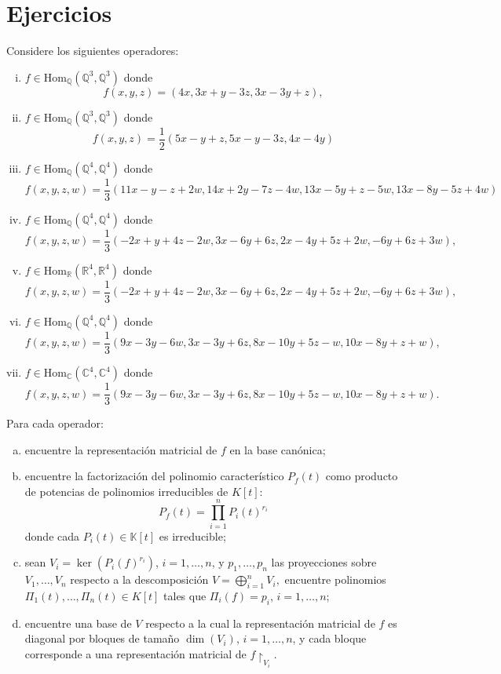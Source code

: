 \section*{Ejercicios}
Considere los siguientes operadores:
\begin{enumerate}[(i)]
\item $f\in\textrm{Hom}_{\mathbb{Q}}(\mathbb{Q}^3,\mathbb{Q}^3)$ donde
$$f(x,y,z)=(4x,3x+y-3z,3x-3y+z),$$
\item $f\in\textrm{Hom}_{\mathbb{Q}}(\mathbb{Q}^3,\mathbb{Q}^3)$ donde
$$f(x,y,z)=\frac{1}{2}(5x-y+z,5x-y-3z,4x-4y)$$
\item $f\in\textrm{Hom}_{\mathbb{Q}}(\mathbb{Q}^4,\mathbb{Q}^4)$ donde
$$f(x,y,z,w)=\frac{1}{3}(11x-y-z+2w,14x+2y-7z-4w,13x-5y+z-5w,13x-8y-5z+4w)$$
\item $f\in\textrm{Hom}_{\mathbb{Q}}(\mathbb{Q}^4,\mathbb{Q}^4)$ donde
$$f(x,y,z,w)=\dfrac{1}{3}(-2x+y+4z-2w,3x-6y+6z,2x-4y+5z+2w,-6y+6z+3w),$$
\item $f\in\textrm{Hom}_{\mathbb{R}}(\mathbb{R}^4,\mathbb{R}^4)$ donde
$$f(x,y,z,w)=\dfrac{1}{3}(-2x+y+4z-2w,3x-6y+6z,2x-4y+5z+2w,-6y+6z+3w),$$
\item $f\in\textrm{Hom}_{\mathbb{Q}}(\mathbb{Q}^4,\mathbb{Q}^4)$ donde
$$f(x,y,z,w)=\dfrac{1}{3}(9x-3y-6w,3x-3y+6z,8x-10y+5z-w,10x-8y+z+w),$$
\item $f\in\textrm{Hom}_{\mathbb{C}}(\mathbb{C}^4,\mathbb{C}^4)$ donde
$$f(x,y,z,w)=\dfrac{1}{3}(9x-3y-6w,3x-3y+6z,8x-10y+5z-w,10x-8y+z+w).$$
\end{enumerate}

Para cada operador:
\begin{enumerate}[(a)]
\item encuentre la representaci\'on matricial de $f$ en la base can\'onica;
\item encuentre la factorizaci\'on del polinomio caracter\'istico $P_f(t)$ como producto de potencias de polinomios irreducibles de $K[t]$:
$$P_f(t)=\prod_{i=1}^n P_i(t)^{r_i}$$
donde cada $P_i(t)\in\mathbb{K}[t]$ es irreducible;
\item sean $V_i=\ker \left(P_i(f)^{r_i}\right)$, $i=1,\ldots,n$, y $p_1,\ldots,p_n$ las proyecciones sobre $V_1,\ldots,V_n$ respecto a la descomposici\'on
$V=\bigoplus_{i=1}^n V_i,$
encuentre polinomios $\Pi_1(t),\ldots,\Pi_n(t)\in K[t]$ tales que $\Pi_i(f)=p_i$, $i=1,\ldots,n$;
\item encuentre una base de $V$ respecto a la cual la representaci\'on matricial de $f$ es diagonal por bloques de tama\~no $\dim(V_i)$, $i=1,\ldots,n$, y cada bloque corresponde a una representaci\'on matricial de $f\!\upharpoonright_{V_i}$.
\end{enumerate}

